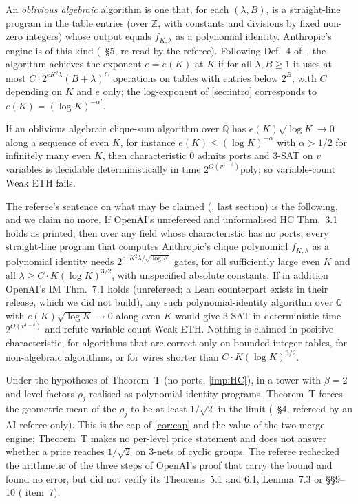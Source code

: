 \documentclass[10pt]{amsart}
\theoremstyle{plain}
\theoremstyle{definition}
\theoremstyle{remark}
\numberwithin{equation}{section}
\newcommand{\Z}{\mathbb{Z}}
\newcommand{\Q}{\mathbb{Q}}
\newcommand{\stR}{refereed by an AI referee only}
\newcommand{\cond}[1]{conditional on #1}
\begin{document}
An \emph{oblivious algebraic} algorithm is one that, for each $(\lambda,B)$, is a straight-line program in
the table entries (over $\Z$, with constants and divisions by fixed non-zero integers) whose output equals
$f_{K,\lambda}$ as a polynomial identity. Anthropic's engine is of this kind (~\S5, re-read by
the referee). Following Def.~4 of~\cite{AnthropicETH}, the algorithm achieves the exponent $e=e(K)$ at $K$ if
for all $\lambda,B\ge1$ it uses at most $C\cdot2^{eK^2\lambda}(B+\lambda)^C$ operations on tables with entries
below $2^B$, with $C$ depending on $K$ and $e$ only; the log-exponent of \cref{sec:intro} corresponds to
$e(K)=(\log K)^{-\alpha'}$.

\begin{corollary}[\stR; \cond{\cref{imp:HC,imp:IM}}]\label{cor:T2}
If an oblivious algebraic clique-sum algorithm over $\Q$ has $e(K)\sqrt{\log K}\to0$ along a sequence of even
$K$, for instance $e(K)\le(\log K)^{-\alpha}$ with $\alpha>1/2$ for infinitely many even $K$, then
characteristic $0$ admits ports and 3-SAT on $v$ variables is decidable deterministically in time
$2^{O(v^{1-\delta})}\mathrm{poly}$; so variable-count Weak ETH fails.
\end{corollary}

The referee's sentence on what may be claimed (, last section) is the following, and we
claim no more. If OpenAI's unrefereed and unformalised HC Thm.~3.1 holds as printed, then over any field
whose characteristic has no ports, every straight-line program that computes Anthropic's clique polynomial
$f_{K,\lambda}$ as a polynomial identity needs $2^{c\cdot K^2\lambda/\sqrt{\log K}}$ gates, for all
sufficiently large even $K$ and all $\lambda\ge C\cdot K(\log K)^{3/2}$, with unspecified absolute constants. If
in addition OpenAI's IM Thm.~7.1 holds (unrefereed; a Lean counterpart  exists in
their release, which we did not build), any such polynomial-identity algorithm over $\Q$ with
$e(K)\sqrt{\log K}\to0$ along even $K$ would give 3-SAT in deterministic time $2^{O(v^{1-\delta})}$ and refute
variable-count Weak ETH. Nothing is claimed in positive characteristic, for algorithms that are correct only
on bounded integer tables, for non-algebraic algorithms, or for wires shorter than $C\cdot K(\log K)^{3/2}$.

Under the hypotheses of Theorem~T (no ports, \cref{imp:HC}), in a tower with $\beta=2$ and level factors
$\rho_j$ realised as polynomial-identity programs, Theorem~T forces the geometric mean of the $\rho_j$ to
be at least $1/\sqrt2$ in the limit (~\S4, \stR). This is the cap of \cref{cor:cap} and the value of the two-merge engine;
Theorem~T makes no per-level price statement and does not answer whether a price reaches $1/\sqrt2$ on
3-nets of cyclic groups. The referee rechecked the arithmetic of the three steps of OpenAI's proof that carry
the bound and found no error, but did not verify its Theorems~5.1 and 6.1, Lemma~7.3 or \S\S9--10
( item~7).
\end{document}
